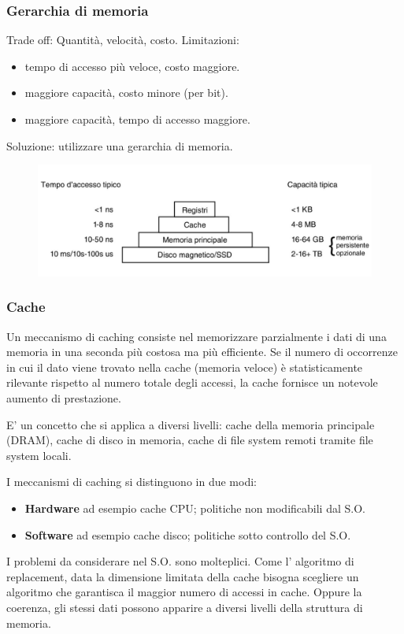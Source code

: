 \subsubsection{Gerarchia di memoria}
Trade off: Quantità, velocità, costo.
\newline
Limitazioni:
\begin{itemize}
    \item tempo di accesso più veloce, costo maggiore.
    \item maggiore capacità, costo minore (per bit).
    \item maggiore capacità, tempo di accesso maggiore.
\end{itemize}
Soluzione: utilizzare una gerarchia di memoria.
\begin{figure}[h]
    \centering
    \includegraphics[width=0.7\linewidth]{Images/Screenshot 2024-12-17 at 19-02-22 so-01-intro-os.pptx - so-01-intro-os.pdf.png}
    \label{fig:enter-label}
\end{figure}

\subsubsection{Cache}
Un meccanismo di caching consiste nel memorizzare parzialmente i dati di una memoria in una
seconda più costosa ma più efficiente. Se il numero di occorrenze in cui il dato viene trovato nella cache
(memoria veloce) è statisticamente rilevante rispetto al numero totale degli accessi, la cache fornisce un notevole aumento di prestazione.

E' un concetto che si applica a diversi livelli: cache della memoria principale (DRAM), cache di disco in memoria, cache di file system remoti tramite file system locali.

I meccanismi di caching si distinguono in due modi:
\begin{itemize}
    \item \textbf{Hardware} ad esempio cache CPU; politiche non modificabili dal S.O.
    \item \textbf{Software} ad esempio cache disco; politiche sotto controllo del S.O.
\end{itemize}
I problemi da considerare nel S.O. sono molteplici. Come l' algoritmo di replacement, data la dimensione limitata della cache bisogna scegliere un algoritmo che garantisca il maggior numero di accessi in cache. Oppure la coerenza, gli stessi dati possono apparire a diversi livelli della struttura di memoria.

